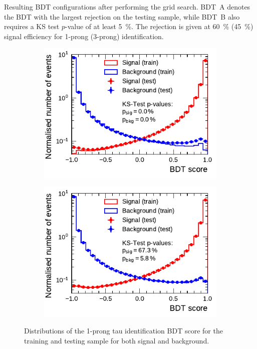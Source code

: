 \begin{table}[htb]
  \centering
  {\small}
  \caption{Resulting BDT configurations after performing the grid search. BDT~A
    denotes the BDT with the largest rejection on the testing sample, while
    BDT~B also requires a KS test $p$-value of at least \SI{5}{\percent}. The
    rejection is given at \SI{60}{\percent} (\SI{45}{\percent}) signal
    efficiency for 1-prong (3-prong) identification.}
  \label{tab:bdt_perfs}
\end{table}

\begin{figure}[htb]
  \begin{subfigure}[t]{0.48\textwidth}
    \centering
    \includegraphics{./figures/bdt_perf/scores/grid_1p0304.pdf}
    \label{fig:bdt_score_1p}
  \end{subfigure}\hfill
  \begin{subfigure}[t]{0.48\textwidth}
    \centering
    \includegraphics{./figures/bdt_perf/scores/grid_1p_subsampling0269.pdf}
    \label{fig:bdt_score_1p_ks5}
  \end{subfigure}
  \caption{Distributions of the 1-prong tau identification BDT score for the
    training and testing sample for both signal and background.}
  \label{fig:bdt_overfitting_scores}
\end{figure}

